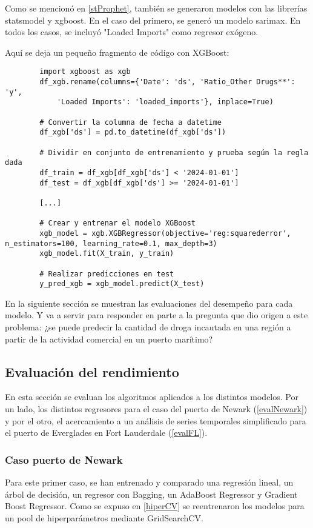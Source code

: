 \documentclass[12pt]{article}
\begin{document}
 	Como se mencionó en \ref{stProphet}, también se generaron modelos con las librerías statsmodel y xgboost. En el caso del primero, se generó un modelo sarimax. En todos los casos, se incluyó "Loaded Imports" como regresor exógeno.
 	
 	Aquí se deja un pequeño fragmento de código con XGBoost:
 	\begin{verbatim}
 		import xgboost as xgb
 		df_xgb.rename(columns={'Date': 'ds', 'Ratio_Other Drugs**': 'y', 
 			'Loaded Imports': 'loaded_imports'}, inplace=True)
 		
 		# Convertir la columna de fecha a datetime
 		df_xgb['ds'] = pd.to_datetime(df_xgb['ds'])
 		
 		# Dividir en conjunto de entrenamiento y prueba según la regla dada
 		df_train = df_xgb[df_xgb['ds'] < '2024-01-01']
 		df_test = df_xgb[df_xgb['ds'] >= '2024-01-01']
 		
 		[...]
 		
 		# Crear y entrenar el modelo XGBoost
 		xgb_model = xgb.XGBRegressor(objective='reg:squarederror', n_estimators=100, learning_rate=0.1, max_depth=3)
 		xgb_model.fit(X_train, y_train)
 		
 		# Realizar predicciones en test
 		y_pred_xgb = xgb_model.predict(X_test)
 	\end{verbatim}
 
 	En la siguiente sección se muestran las evaluaciones del desempeño para cada modelo. Y va a servir para responder en parte a la pregunta que dio origen a este problema: ¿se puede predecir la cantidad de droga incautada en una región a partir de la actividad comercial en un puerto marítimo?

	\subsection{\label{eval performance}Evaluación del rendimiento}
	En esta sección se evaluan los algoritmos aplicados a los distintos modelos. Por un lado, los distintos regresores para el caso del puerto de Newark (\ref{evalNewark}) y por el otro, el acercamiento a un análisis de series temporales simplificado para el puerto de Everglades en Fort Lauderdale (\ref{evalFL}).
	
	\subsubsection{\label{evalNewark} Caso puerto de Newark}
	Para este primer caso, se han entrenado y comparado una regresión lineal, un árbol de decisión, un regresor con Bagging, un AdaBoost Regressor y Gradient Boost Regressor. Como se expuso en \ref{hiperCV} se reentrenaron los modelos para un pool de hiperparámetros mediante GridSearchCV.
	
\end{document}
